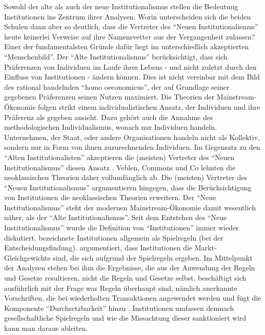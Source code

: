 Sowohl der alte als auch der neue Institutionalismus stellen die Bedeutung Institutionen ins Zentrum ihrer Analysen. Worin unterscheiden sich die beiden Schulen dann aber so deutlich, dass die Vertreter des "`Neuen Institutionalismus"' heute keinerlei Verweise auf ihre Namensvetter aus der Vergangenheit zulassen? Einer der fundamentalsten Gründe dafür liegt im unterschiedlich akzeptierten "`Menschenbild"'. Der "`Alte Institutionalismus"' berücksichtigt, dass sich Präferenzen von Individuen im Laufe ihres Lebens - und nicht zuletzt durch den Einfluss von Institutionen - ändern können. Dies ist nicht vereinbar mit dem Bild des rational handelnden "`homo oeconomicus"', der auf Grundlage seiner gegebenen Präferenzen seinen Nutzen maximiert. Die Theorien der Mainstream-Ökonomie folgen strikt einem individualistischen Ansatz, der Individuen und ihre Präferenz als gegeben ansieht. Dazu gehört auch die Annahme des methodologischen Individualismus, wonach nur Individuen handeln. Unternehmen, der Staat, oder andere Organisationen handeln nicht als Kollektiv, sondern nur in Form von ihnen zuzurechnenden Individuen. Im Gegensatz zu den "`Alten Institutionalisten"' akzeptieren die (meisten) Vertreter des "`Neuen Institutionalismus"' diesen Ansatz \parencite[S. 177]{Hodgson1998}. Veblen, Commons und Co lehnten die neoklassischen Theorien daher vollumfänglich ab. Die (meisten) Vertreter des "`Neuen Institutionalismus"' argumentieren hingegen, dass die Berücksichtigung von Institutionen die neoklassischen Theorien erweitern. Der "`Neue Institutionalismus"' steht der modernen Mainstream-Ökonomie damit wesentlich näher, als der "`Alte Institutionalismus"'.
Seit dem Entstehen des "`Neue Institutionalismus"' wurde die Definition von "`Institutionen"' immer wieder diskutiert. \textcite[S. 4]{Riker1980} bezeichnete Institutionen allgemein als Spielregeln (bei der Entscheidungsfindung). \textcite{Schotter1981} argumentiert, dass Institutionen die Markt-Gleichgewichte sind, die sich aufgrund der Spielregeln ergeben. Im Mittelpunkt der Analysen stehen bei ihm die Ergebnisse, die aus der Anwendung der Regeln und Gesetze resultieren, nicht die Regeln und Gesetze selbst. \textcite{Ostrom1986} beschäftigt sich ausführlich mit der Frage was Regeln überhaupt sind, nämlich anerkannte Vorschriften, die bei wiederholten Transaktionen angewendet werden \parencite[S. 5]{Ostrom1986} und fügt die Komponente "`Durchsetzbarkeit"' hinzu \parencite[S. 6]{Ostrom1986}. Institutionen umfassen demnach gesellschaftliche Spielregeln und wie die Missachtung dieser sanktioniert wird \parencite[S. 26]{Voigt2009} kann man daraus ableiten.

